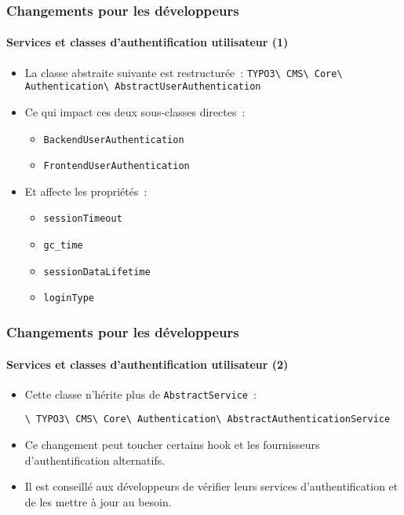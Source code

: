 \begin{frame}[fragile]
	\frametitle{Changements pour les développeurs}
	\framesubtitle{Services et classes d'authentification utilisateur (1)}

	\begin{itemize}
		\item La classe abstraite suivante est restructurée~:\newline
			\small\texttt{TYPO3\textbackslash
				CMS\textbackslash
				Core\textbackslash
				Authentication\textbackslash
				AbstractUserAuthentication}\normalsize
		\item Ce qui impact ces deux sous-classes directes~:

			\begin{itemize}
				\item \texttt{BackendUserAuthentication}
				\item \texttt{FrontendUserAuthentication}
			\end{itemize}

		\item Et affecte les propriétés~:

			\begin{itemize}
				\item \texttt{sessionTimeout}
				\item \texttt{gc\_time}
				\item \texttt{sessionDataLifetime}
				\item \texttt{loginType}
			\end{itemize}

	\end{itemize}

\end{frame}


\begin{frame}[fragile]
	\frametitle{Changements pour les développeurs}
	\framesubtitle{Services et classes d'authentification utilisateur (2)}

	\begin{itemize}

		\item Cette classe n'hérite plus de
			\smaller\texttt{AbstractService}~:\normalsize\hspace{0.1cm}
			
			\smaller\texttt{\textbackslash
				TYPO3\textbackslash
				CMS\textbackslash
				Core\textbackslash
				Authentication\textbackslash
				AbstractAuthenticationService}\normalsize

		\item Ce changement peut toucher certains hook et les fournisseurs d'authentification alternatifs.

		\item Il est conseillé aux développeurs de vérifier leurs services d'authentification et de les mettre
			à jour au besoin.

	\end{itemize}

\end{frame}


